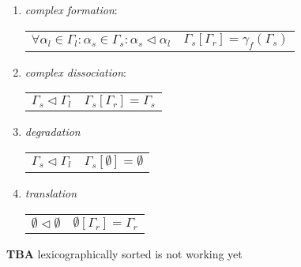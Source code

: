 \documentclass[12pt]{article}
\begin{document}
\begin{enumerate}
\begin{itemize}
\end{itemize}

\item \textit{complex formation}:
\begin{center}
\begin{tabular}{ l l }
	$ \forall \alpha_l \in \Gamma_l: \alpha_s \in \Gamma_s: \alpha_s \lhd \alpha_l $ & \hspace*{1cm} $\Gamma_s[\Gamma_r] = \gamma_f(\Gamma_s)$
\end{tabular}
\end{center}

\item \textit{complex dissociation}:
\begin{center}
\begin{tabular}{ l l }
	$ \Gamma_s \lhd \Gamma_l $ & \hspace*{1cm} $ \Gamma_s[\Gamma_r] = \Gamma_s $
\end{tabular}
\end{center}

\item \textit{degradation}
\begin{center}
\begin{tabular}{ l l }
	$ \Gamma_s \lhd \Gamma_l $ & \hspace*{1cm} $ \Gamma_s[\emptyset] = \emptyset $
\end{tabular}
\end{center}

\item \textit{translation}
\begin{center}
\begin{tabular}{ l l }
	$ \emptyset \lhd \emptyset $ & \hspace*{1cm} $ \emptyset[\Gamma_r] = \Gamma_r $
\end{tabular}
\end{center}

\end{enumerate}


\textbf{TBA} lexicographically sorted is not working yet
\end{document}
